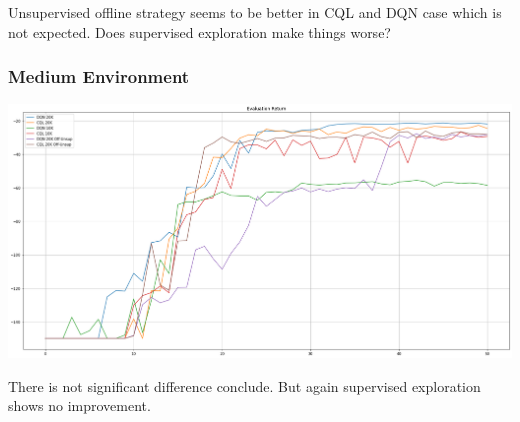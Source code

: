 \documentclass[11pt]{article}
\begin{document}
    Unsupervised offline strategy seems to be better in CQL and DQN case which is not expected.
    Does supervised exploration make things worse?

    \subsubsection{Medium Environment}

    \hspace*{-0.3in}
    \includegraphics[scale=0.30]{q3-offline/medium-eval}

    There is not significant difference conclude.
    But again supervised exploration shows no improvement.
\end{document}
